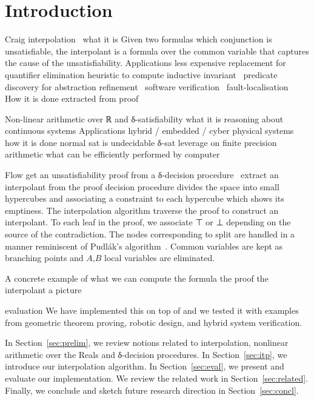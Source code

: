 \section{Introduction}
\label{sec:intro}

Craig interpolation~\cite{MR0104564}
    what it is
        Given two formulas which conjunction is unsatisfiable, the interpolant is a formula over the common variable that captures the cause of the unsatisfiability.
    Applications 
        less expensive replacement for quantifier elimination
        heuristic to compute inductive invariant~\cite{DBLP:conf/cav/McMillan03,DBLP:conf/vmcai/McMillan07,DBLP:conf/sas/McMillan11}
        predicate discovery for abstraction refinement~\cite{DBLP:conf/cav/McMillan06}
        software verification~\cite{DBLP:conf/vmcai/AlbarghouthiGC12,DBLP:conf/cav/AlbarghouthiLGC12,DBLP:conf/esop/AlbarghouthiBCK15}
        fault-localisation~\cite{DBLP:conf/fm/ErmisSW12,DBLP:conf/vmcai/ChristESW13,DBLP:conf/sigsoft/SchafSW13}
    How it is done
        extracted from proof
    

Non-linear arithmetic over ℝ and δ-satisfiability
    what it is
        reasoning about continuous systems
    Applications 
        hybrid / embedded / cyber physical systems
    how it is done
        normal sat is undecidable
        δ-sat leverage on finite precision arithmetic what can be efficiently performed by computer

Flow
    get an unsatisfiability proof from a δ-decision procedure~\cite{DBLP:conf/synasc/GaoKC14}
    extract an interpolant from the proof
        decision procedure divides the space into small hypercubes and associating a constraint to each hypercube which shows its emptiness.
        The interpolation algorithm traverse the proof to construct an interpolant.
        To each leaf in the proof, we associate ⊤ or ⊥ depending on the source of the contradiction.
        The nodes corresponding to split are handled in a manner reminiscent of Pudl{\'a}k's algorithm~\cite{MR1472134}.
        Common variables are kept as branching points and $A$,$B$ local variables are eliminated.

A concrete example of what we can compute 
    the formula
    the proof
    the interpolant
    a picture

evaluation
    We have implemented this on top of \dReal
    and we tested it with examples from geometric theorem proving, robotic design, and hybrid system verification.  

In Section~\ref{sec:prelim}, we review notions related to interpolation, nonlinear arithmetic over the Reals and δ-decision procedures.
In Section~\ref{sec:itp}, we introduce our interpolation algorithm.
In Section~\ref{sec:eval}, we present and evaluate our implementation.
We review the related work in Section~\ref{sec:related}.
Finally, we conclude and sketch future research direction in Section~\ref{sec:concl}.
